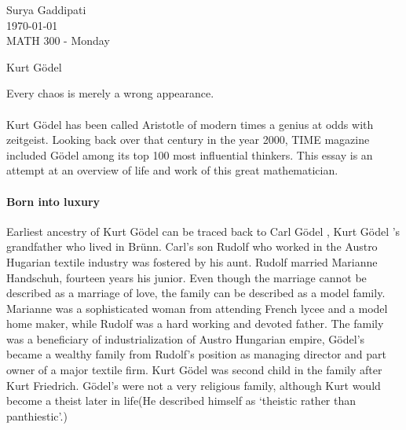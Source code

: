 \documentclass[12pt]{article}
\newcommand{\kg}{Kurt G{\"o}del }
\newcommand{\gd}{G{\"o}del }
\newcommand{\gds}{G{\"o}del's }
\begin{document}
 

\noindent Surya Gaddipati\\
\today\\
MATH 300 - Monday

\begin{center}
  \kg 
\end{center}

\begin{center}
Every chaos is merely a wrong appearance. 
\end{center}
 \paragraph{}
 \kg has been called Aristotle of modern times a genius at odds with zeitgeist. Looking back over that century in the year 2000, TIME magazine included \gd among its top 100 most influential thinkers. This essay is an attempt at an overview of life and work of this great mathematician. 

 \paragraph{Born into luxury}
 Earliest ancestry of \kg can be traced back to Carl \gd, \kg's  grandfather who lived in Br\"unn. Carl's son Rudolf who worked in the Austro Hugarian textile industry was fostered by his aunt. Rudolf married Marianne Handschuh, fourteen years his junior. Even though the marriage cannot be described as a marriage of love, the family can be described as a model family. Marianne was a sophisticated woman from attending French lycee and a model home maker, while Rudolf was a hard working and devoted father.
 The family was a  beneficiary of industrialization of Austro Hungarian empire, \gds became a wealthy family from Rudolf's position as managing director and part owner of a major textile firm.
 \kg was second child in the family after Kurt Friedrich. \gds were not a very religious family, although Kurt would become a theist later in life(He described himself as `theistic rather than panthiestic'.)
\end{document}
